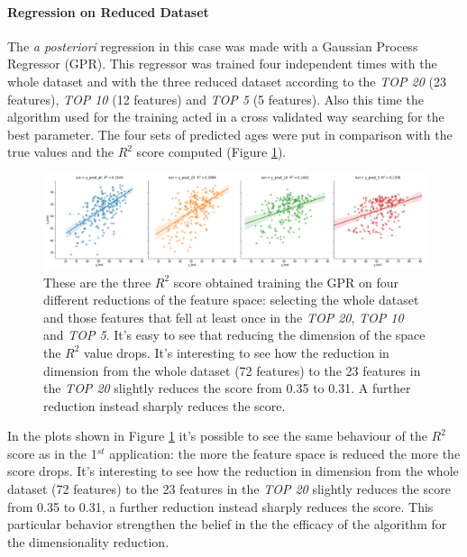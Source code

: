 \documentclass{article}
\begin{document}
\paragraph{Regression on Reduced Dataset} The \emph{a posteriori} regression in this case was made with a Gaussian Process Regressor (GPR). This regressor was trained four independent times with the whole dataset and with the three reduced dataset according to the \emph{TOP 20} (23 features), \emph{TOP 10} (12 features)  and \emph{TOP 5} (5 features). Also this time the algorithm used for the training acted in a cross validated way searching for the best parameter. The four sets of predicted ages were put in comparison with the true values and the $R^2$ score computed (Figure \ref{fig:Cardio_graphs}).

\begin{figure}[ht]
	\centerline{\includegraphics[width=1.3\textwidth]{four_graphs}}
	\caption{These are the three $R^2$ score obtained training the GPR on four different reductions of the feature space: selecting the whole dataset and those features that fell at least once in the \emph{TOP 20}, \emph{TOP 10} and \emph{TOP 5}. It's easy to see that reducing the dimension of the space the $R^2$ value drops. It's interesting to see how the reduction in dimension from the whole dataset (72 features) to the 23 features in the \emph{TOP 20} slightly reduces the score from 0.35 to 0.31. A further reduction instead sharply reduces the score.}
	\label{fig:Cardio_graphs}
	\centering
\end{figure}

In the plots shown in Figure \ref{fig:Cardio_graphs} it's possible to see the same behaviour of the $R^2$ score as in the 1$^{st}$ application: the more the feature space is reduced the more the score drops. It's interesting to see how the reduction in dimension from the whole dataset (72 features) to the 23 features in the \emph{TOP 20} slightly reduces the score from 0.35 to 0.31, a further reduction instead sharply reduces the score. This particular behavior strengthen the belief in the the efficacy of the algorithm for the dimensionality reduction.
\end{document}
